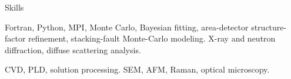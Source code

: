 
\begin{rubric}{Skills}
\begin{multicols}{2}
    Fortran, Python, MPI, Monte Carlo, Bayesian fitting, area-detector structure-factor refinement, stacking-fault Monte-Carlo modeling.
    X-ray and neutron diffraction, diffuse scattering analysis.

\columnbreak

    CVD, PLD, solution processing.
    SEM, AFM, Raman, optical microscopy.
\end{multicols}
\end{rubric}
